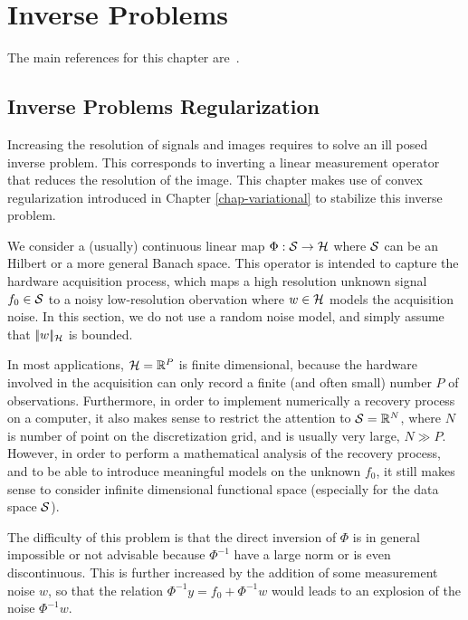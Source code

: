 
\chapter{Inverse Problems}

The main references for this chapter are~\cite{mallat2008wavelet,scherzer2009variational,engl1996regularization}.

\section{Inverse Problems Regularization}

Increasing the resolution of signals and images requires to solve an ill posed inverse problem. This corresponds to inverting a linear measurement operator that reduces the resolution of the image. This chapter makes use of convex regularization introduced in Chapter \ref{chap-variational} to stabilize this inverse problem.

We consider a (usually) continuous linear map $\Phi : \mathcal{S} \rightarrow \mathcal{H}$ where $\mathcal{S}$ can be an Hilbert or a more general Banach space.
%
This operator is intended to capture the hardware acquisition process, which maps a high resolution unknown signal $f_0 \in \mathcal{S}$ to a noisy low-resolution obervation 
where $w \in \mathcal{H}$ models the acquisition noise. In this section, we do not use a random noise model, and simply assume that $|\!| w |\!|_{\mathcal{H}}$ is bounded.

In most applications, $\mathcal{H}=\mathbb{R}^P$ is finite dimensional, because the hardware involved in the acquisition can only record a finite (and often small) number $P$ of observations.
%
Furthermore, in order to implement numerically a recovery process on a computer, it also makes sense to restrict the attention to $\mathcal{S}=\mathbb{R}^N$,  where $N$ is number of point on the discretization grid, and is usually very large, $N \gg P$. 
%
However, in order to perform a mathematical analysis of the recovery process, and to be able to introduce meaningful models on the unknown $f_0$, it still makes sense to consider infinite dimensional functional space (especially for the data space $\mathcal{S}$).

The difficulty of this problem is that the direct inversion of $\Phi$ is in general impossible or not advisable because $\Phi^{-1}$ have a large norm or is even discontinuous. This is further increased by the addition of some measurement noise $w$, so that the relation $\Phi^{-1} y=f_0+\Phi^{-1}w$ would leads to an explosion of the noise $\Phi^{-1}w$.

